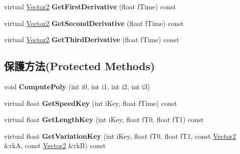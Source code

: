 \begin{DoxyCompactItemize}
\item 
virtual \hyperlink{class_magnum_1_1_vector2}{Vector2} {\bfseries Get\+First\+Derivative} (float f\+Time) const \hypertarget{class_magnum_1_1_t_c_b_spline2_a243ea5d5a8cae4c909559ab3252731d5}{}\label{class_magnum_1_1_t_c_b_spline2_a243ea5d5a8cae4c909559ab3252731d5}

\item 
virtual \hyperlink{class_magnum_1_1_vector2}{Vector2} {\bfseries Get\+Second\+Derivative} (float f\+Time) const \hypertarget{class_magnum_1_1_t_c_b_spline2_aee9fd57bd03f5ae5f3116faf46f47e6c}{}\label{class_magnum_1_1_t_c_b_spline2_aee9fd57bd03f5ae5f3116faf46f47e6c}

\item 
virtual \hyperlink{class_magnum_1_1_vector2}{Vector2} {\bfseries Get\+Third\+Derivative} (float f\+Time) const \hypertarget{class_magnum_1_1_t_c_b_spline2_a8dc8c839b60b17a3cc4d174c6796bfa9}{}\label{class_magnum_1_1_t_c_b_spline2_a8dc8c839b60b17a3cc4d174c6796bfa9}

\end{DoxyCompactItemize}
\subsection*{保護方法(Protected Methods)}
\begin{DoxyCompactItemize}
\item 
void {\bfseries Compute\+Poly} (int i0, int i1, int i2, int i3)\hypertarget{class_magnum_1_1_t_c_b_spline2_a4a3a52523ecc3b6448dfea00ce881287}{}\label{class_magnum_1_1_t_c_b_spline2_a4a3a52523ecc3b6448dfea00ce881287}

\item 
virtual float {\bfseries Get\+Speed\+Key} (int i\+Key, float f\+Time) const \hypertarget{class_magnum_1_1_t_c_b_spline2_ac10e3d0d743132a87b1e966ba15622ee}{}\label{class_magnum_1_1_t_c_b_spline2_ac10e3d0d743132a87b1e966ba15622ee}

\item 
virtual float {\bfseries Get\+Length\+Key} (int i\+Key, float f\+T0, float f\+T1) const \hypertarget{class_magnum_1_1_t_c_b_spline2_ad26d257e6123034a96b3e32d045054bd}{}\label{class_magnum_1_1_t_c_b_spline2_ad26d257e6123034a96b3e32d045054bd}

\item 
virtual float {\bfseries Get\+Variation\+Key} (int i\+Key, float f\+T0, float f\+T1, const \hyperlink{class_magnum_1_1_vector2}{Vector2} \&rkA, const \hyperlink{class_magnum_1_1_vector2}{Vector2} \&rkB) const \hypertarget{class_magnum_1_1_t_c_b_spline2_a30e13b07f2033e0ce81932d600115036}{}\label{class_magnum_1_1_t_c_b_spline2_a30e13b07f2033e0ce81932d600115036}

\end{DoxyCompactItemize}
